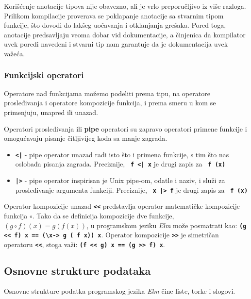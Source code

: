 \documentclass[12pt,oneside]{memoir}
\begin{document}
Korišćenje anotacije tipova nije obavezno, ali je vrlo preporučljivo iz više razloga.
Prilikom kompilacije proverava se poklapanje anotacije sa stvarnim tipom funkcije, što
dovodi do lakšeg uočavanja i otklanjanja grešaka. Pored toga, anotacije predsavljaju veoma
dobar vid dokumentacije, a činjenica da kompilator uvek poredi navedeni i stvarni tip nam
garantuje da je dokumentacija uvek važeća.

\subsubsection{Funkcijski operatori}
Operatore nad funkcijama možemo podeliti prema tipu, na operatore prosleđivanja i operatore
kompozicije funkcija, i prema smeru u kom se primenjuju, unapred ili unazad.

Operatori prosleđivanja ili \textbf{pipe} operatori su zapravo operatori primene funkcije
i omogućavaju pisanje čitljivijeg koda sa manje zagrada.
\begin{itemize}
  \item \texttt{\textbf{<|}} - pipe operator unazad radi isto što i primena funkcije, 
  s tim što nas oslobađa pisanja zagrada. Preciznije, \texttt{\textbf{ f <| x}} je drugi zapis
  za \texttt{\textbf{ f (x)}}
  \item \texttt{\textbf{|>}} - pipe operator inspirisan je Unix pipe-om, odatle i
  naziv, i služi za prosleđivanje argumenta funkciji. Preciznije,  \texttt{\textbf{ x |> f}}
  je drugi zapis za \texttt{\textbf{ f (x)}}
\end{itemize}

Operator kompozicije unazad \texttt{\textbf{<\smallskip<}} predstavlja operator matematičke 
kompozicije funkcija \(\circ\). Tako da se definicija kompozicije dve funkcije, \((g \circ f)(x) = g(f(x))\),
u programskom jeziku \emph{Elm} može posmatrati kao: \texttt{\textbf{(g <\smallskip< f) x == (\textbackslash x\textunderscore ->
g ( f x\textunderscore)) x}}. Operator kompozicije \texttt{\textbf{>\smallskip>}} je
simetričan operatoru \texttt{\textbf{<\smallskip<}}, stoga važi: \texttt{\textbf{(f <\smallskip< g) x == (g >\smallskip> f) x}}.

\subsection{Osnovne strukture podataka}
Osnovne strukture podatka programskog jezika \emph{Elm} čine liste, torke i slogovi. 
\end{document}
